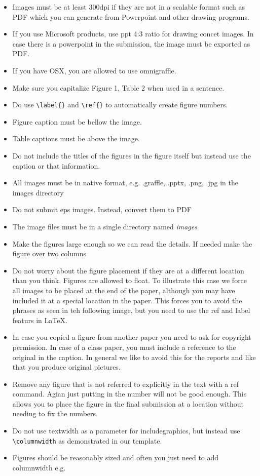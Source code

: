 \begin{itemize}[label=$\Box$]
  \item Images must be at least 300dpi if they are not in a scalable
    format such as PDF which you can generate from Powerpoint and
    other drawing programs. 
  \item If you use Microsoft products, use ppt 4:3 ratio for drawing
    concet images. In case there is a powerpoint in the submission,
    the image must be exported as PDF.
  \item If you have OSX, you are allowed to use omnigraffle.
  \item Make sure you capitalize Figure 1, Table 2 when used in a
    sentence.
  \item Do use \verb|\label{}| and \verb|\ref{}| to automatically create
    figure numbers.
  \item Figure caption must be bellow the image.
  \item Table captions must be above the image.
  \item Do not include the titles of the figures in the figure itself
    but instead use the caption or that information.
  \item All images must be in native format, e.g. .graffle, .pptx,
    .png, .jpg in the images directory
  \item Do not submit eps images. Instead, convert them to PDF
  \item The image files must be in a single directory named {\em
      images}
  \item Make the figures large enough so we can read the details. If
    needed make the figure over two columns
  \item Do not worry about the figure placement if they are at a
    different location than you think. Figures are allowed to
    float. To illustrate this case we force all images to be placed at
    the end of the paper, although you may have included it at a
    special location in the paper. This forces you to avoid the
    phrases as seen in teh following image, but you need to use the
    ref and label featurs in LaTeX.
  \item In case you copied a figure from another paper you need to ask
    for copyright permission. In case of a class paper, you must
    include a reference to the original in the caption. In general we
    like to avoid this for the reports and like that you produce
    original pictures.
  \item Remove any figure that is not referred to explicitly in the
    text with a ref command. Agian just putting in the number will not
    be good enough. This allows you to place the figure in the final
    submission at a location without needing to fix the numbers.
  \item Do not use textwidth as a parameter for includegraphics, but
    instead use \verb|\columnwidth| as demonstrated in our template. 
  \item Figures should be reasonably sized and often you just need to
    add columnwidth e.g.


\end{itemize}
